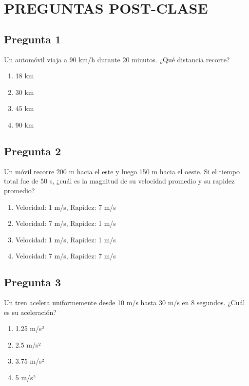 \renewcommand{\tema}{Preguntas Post-Clase - Cinemática}

\twocolumn
\section{PREGUNTAS POST-CLASE}

\begin{preguntabox}
\subsection{Pregunta 1}
Un automóvil viaja a 90 km/h durante 20 minutos. ¿Qué distancia recorre?

\begin{enumerate}
    \item[A)] 18 km
    \item[B)] 30 km
    \item[C)] 45 km
    \item[D)] 90 km
\end{enumerate}
\end{preguntabox}

\begin{preguntabox}
\subsection{Pregunta 2}
Un móvil recorre 200 m hacia el este y luego 150 m hacia el oeste. Si el tiempo total fue de 50 s, ¿cuál es la magnitud de su velocidad promedio y su rapidez promedio?

\begin{enumerate}
    \item[A)] Velocidad: 1 m/s, Rapidez: 7 m/s
    \item[B)] Velocidad: 7 m/s, Rapidez: 1 m/s
    \item[C)] Velocidad: 1 m/s, Rapidez: 1 m/s
    \item[D)] Velocidad: 7 m/s, Rapidez: 7 m/s
\end{enumerate}
\end{preguntabox}

\begin{preguntabox}
\subsection{Pregunta 3}
Un tren acelera uniformemente desde 10 m/s hasta 30 m/s en 8 segundos. ¿Cuál es su aceleración?

\begin{enumerate}
    \item[A)] 1.25 m/s²
    \item[B)] 2.5 m/s²
    \item[C)] 3.75 m/s²
    \item[D)] 5 m/s²
\end{enumerate}
\end{preguntabox}

